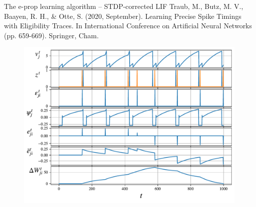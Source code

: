 \documentclass[t]{beamer}
\begin{document}
\begin{frame}{The e-prop learning algorithm -- STDP-corrected LIF}
\tiny{
Traub, M., Butz, M. V., Baayen, R. H., \& Otte, S. (2020, September). Learning Precise Spike Timings with Eligibility Traces. In International Conference on Artificial Neural Networks (pp. 659-669). Springer, Cham.}

	\begin{figure}[!ht]
		\includegraphics[width=0.78\linewidth]{demo_traubfix.pdf}
	\end{figure}
	
\end{frame}
\end{document}
